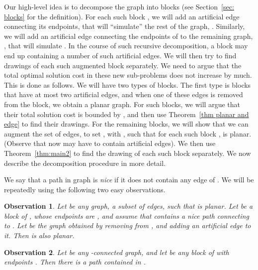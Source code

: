 \documentclass[twoside,leqno,twocolumn]{article}
\newtheorem{observation}{Observation}[section]
\newtheorem{observation}{Observation}
\begin{document}
Our high-level idea is to decompose the graph  into blocks (see Section~\ref{sec: blocks} for the definition). For each such block , we will add an artificial edge connecting its endpoints, that will ``simulate'' the rest of the graph, . Similarly, we will add an artificial edge connecting the endpoints of  to the remaining graph, , that will simulate . In the course of such recursive decomposition, a block may end up containing a number of such artificial edges. We will then try to find drawings of each such augmented block separately. We need to argue that the total optimal solution cost in these new sub-problems does not increase by much. This is done as follows. We will have two types of blocks. The first type is blocks that have at most two artificial edges, and when one of these edges is removed from the block, we obtain a planar graph.  For such blocks, we will argue that their total solution cost is bounded by , and then use Theorem~\ref{thm planar and edge} to find their drawings. For the remaining blocks, we will show that we can augment the set  of edges, to set , with , such that for each such block ,  is planar. (Observe that now  may have to contain artificial edges). We then use Theorem~\ref{thm:main2} to find the drawing of each such block separately. We now describe the decomposition procedure in more detail.

We say that a path  in graph  is \emph{nice} if it does not contain any edge of . We will be repeatedly using the following two easy observations.

\begin{observation}\label{observation: remains planar}
Let  be any graph,  a subset of edges, such that  is planar. Let  be a block of , whose endpoints are , and assume that  contains a nice path connecting  to . Let  be the graph obtained by removing  from , and adding an artificial edge  to it. Then  is also planar.
\end{observation}

\begin{observation}\label{observation: path}
Let  be any -connected graph, and let  be any block of  with endpoints . Then there is a path  contained in .
\end{observation}
\end{document}
